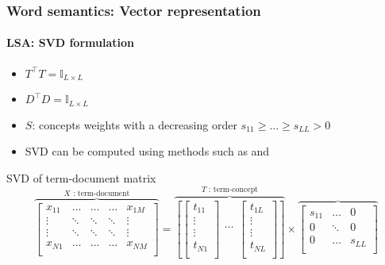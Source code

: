 \documentclass[xcolor=table]{beamer}
\begin{document}
\begin{frame}
	\frametitle{Word semantics: Vector representation}
	\framesubtitle{LSA: SVD formulation}
	
	\begin{itemize}
		\item $T^\top T = \mathbb{I}_{L \times L}$ 
		\item $D^\top D = \mathbb{I}_{L \times L}$ 
		\item $S$: concepts weights with a decreasing order $s_{11} \ge ... \ge s_{LL} > 0$
		\item SVD can be computed using methods such as  and 
	\end{itemize}
	
	\begin{block}{SVD of term-document matrix}
		\scriptsize\bfseries
		\[
		\overbrace{
			\begin{bmatrix}
			x_{11} & \ldots & \ldots & \ldots & x_{1M} \\ 
			\vdots & \ddots & \ddots & \ddots &\vdots \\
			\vdots & \ddots & \ddots & \ddots &\vdots \\
			x_{N1} & \ldots & \ldots & \ldots & x_{NM} \\ 
			\end{bmatrix}
		}^{X \text{ : term-document}}
		=
		\overbrace{
			\left[
			\begin{bmatrix}
			t_{11} \\ 
			\vdots \\
			\vdots \\
			t_{N1} \\ 
			\end{bmatrix}
			\begin{matrix}
			\ldots \\ 
			\end{matrix}
			\begin{bmatrix}
			t_{1L} \\ 
			\vdots \\
			\vdots \\
			t_{NL} \\ 
			\end{bmatrix}
			\right]
		}^{T \text{ : term-concept}}
		\times 
		\overbrace{
			\begin{bmatrix}
			s_{11} & \ldots & 0 \\
			0 & \ddots & 0 \\
			0 & \ldots & s_{LL} \\
			\end{bmatrix}
}\]
\end{block}
\end{frame}
\end{document}
